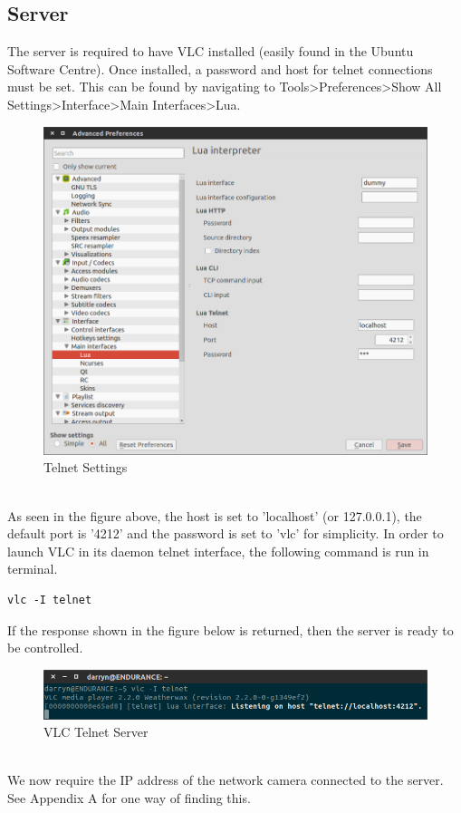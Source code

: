 \documentclass[a4paper,11pt]{report}
\begin{document}
\subsection{Server}
The server is required to have VLC installed (easily found in the Ubuntu Software Centre). Once installed, a password and host for telnet connections must be set. This can be found by navigating to Tools>Preferences>Show All Settings>Interface>Main Interfaces>Lua.
\begin{figure}[h]
  \begin{center}
    \includegraphics[scale = 0.4]{settings}
    \caption{Telnet Settings}
  \end{center}
\end{figure} \\
As seen in the figure above, the host is set to 'localhost' (or 127.0.0.1), the default port is '4212' and the password is set to 'vlc' for simplicity. In order to launch VLC in its daemon telnet interface, the following command is run in terminal.
\begin{lstlisting}
vlc -I telnet
\end{lstlisting}
If the response shown in the figure below is returned, then the server is ready to be controlled.   
\begin{figure}[h]
   \begin{center}
     \includegraphics[scale=0.5]{server_vlc}
     \caption{VLC Telnet Server}
   \end{center}
 \end{figure} \\ 
We now require the IP address of the network camera connected to the server. See Appendix A for one way of finding this. 
\end{document}
